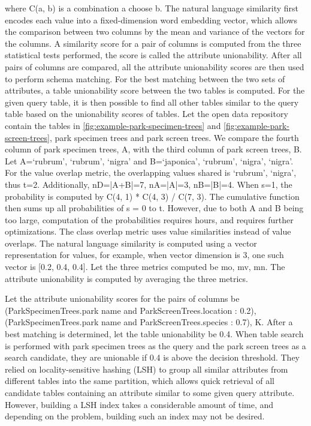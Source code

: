 where C(a, b) is a combination a choose b. The natural language similarity first encodes each value into a fixed-dimension word embedding vector, which allows the comparison between two columns by the mean and variance of the vectors for the columns.
A similarity score for a pair of columns is computed from the three statistical tests performed, the score is called the attribute unionability. After all pairs of columns are compared, all the attribute unionability scores are then used to perform schema matching. For the best matching between the two sets of attributes, a table unionability score between the two tables is computed. For the given query table, it is then possible to find all other tables similar to the query table based on the unionability scores of tables.
Let the open data repository contain the tables in \autoref{fig:example-park-specimen-trees} and \autoref{fig:example-park-screen-trees}, park specimen trees and park screen trees. We compare the fourth column of park specimen trees, A, with the third column of park screen trees, B. Let A={`rubrum', `rubrum', `nigra'} and B={`japonica', `rubrum', `nigra', `nigra'}. For the value overlap metric, the overlapping values shared is {`rubrum', `nigra'}, thus t=2. Additionally, nD=|A+B|=7, nA=|A|=3, nB=|B|=4. When s=1, the probability is computed by C(4, 1) * C(4, 3) / C(7, 3). The cumulative function then sums up all probabilities of s = 0 to t. However, due to both A and B being too large, computation of the probabilities requires hours, and requires further optimizations. The class overlap metric uses value similarities instead of value overlaps. The natural language similarity is computed using a vector representation for values, for example, when vector dimension is 3, one such vector is [0.2, 0.4, 0.4]. Let the three metrics computed be {mo, mv, mn}. The attribute unionability is computed by averaging the three metrics.

Let the attribute unionability scores for the pairs of columns be {(ParkSpecimenTrees.park name and ParkScreenTrees.location : 0.2), (ParkSpecimenTrees.park name and ParkScreenTrees.species : 0.7), K}. After a best matching is determined, let the table unionability be 0.4. When table search is performed with park specimen trees as the query and the park screen trees as a search candidate, they are unionable if 0.4 is above the decision threshold.
They relied on locality-sensitive hashing (LSH) to group all similar attributes from different tables into the same partition, which allows quick retrieval of all candidate tables containing an attribute similar to some given query attribute. However, building a LSH index takes a considerable amount of time, and depending on the problem, building such an index may not be desired.

